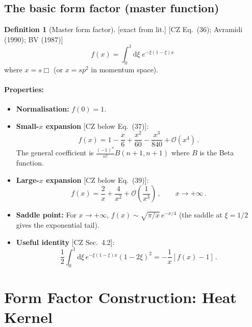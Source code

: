 \documentclass[12pt,a4paper]{article}
\theoremstyle{definition}
\newtheorem{definition}[proposition]{Definition}
\theoremstyle{remark}
\newcommand{\dd}{\mathrm{d}}
\newcommand{\fromlit}[1]{\textcolor{blue!70!black}{\textsf{[#1]}}}
\newcommand{\exactlit}{\textcolor{blue!60!black}{\textsf{[exact from lit.]}}}
\begin{document}
\subsection{The basic form factor (master function)}

\begin{definition}[Master form factor]
\exactlit\;
\fromlit{CZ Eq.~(36); Avramidi (1990); BV (1987)}
\begin{equation}
  \boxed{
  f(x) = \int_0^1 \dd\xi\; e^{-\xi(1-\xi)x}
  }
  \label{eq:master-f}
\end{equation}
where $x = s\Box$ (or $x = sp^2$ in momentum space).
\end{definition}

\paragraph{Properties:}
\begin{itemize}
\item \textbf{Normalisation:} $f(0) = 1$.
\item \textbf{Small-$x$ expansion} \fromlit{CZ below Eq.~(37)}:
  \begin{equation}
    f(x) = 1 - \frac{x}{6} + \frac{x^2}{60} - \frac{x^3}{840}
    + \mathcal{O}(x^4)\,.
    \label{eq:f-small}
  \end{equation}
  The general coefficient is
  $\frac{(-1)^n}{n!}B(n+1,n+1)$ where $B$ is the Beta function.
\item \textbf{Large-$x$ expansion} \fromlit{CZ below Eq.~(39)}:
  \begin{equation}
    f(x) = \frac{2}{x} + \frac{4}{x^2}
    + \mathcal{O}\!\left(\frac{1}{x^3}\right)\,,
    \qquad x\to+\infty\,.
    \label{eq:f-large}
  \end{equation}
\item \textbf{Saddle point:} For $x\to+\infty$,
  $f(x) \sim \sqrt{\pi/x}\,e^{-x/4}$
  (the saddle at $\xi=1/2$ gives the exponential tail).
\item \textbf{Useful identity} \fromlit{CZ Sec.~4.2}:
  \begin{equation}
    \frac{1}{2}\int_0^1\dd\xi\, e^{-\xi(1-\xi)x}(1-2\xi)^2
    = -\frac{1}{x}[f(x)-1]\,.
    \label{eq:f-identity}
  \end{equation}
\end{itemize}


\newpage
\section{Form Factor Construction: Heat Kernel}
\label{sec:form-factors-hk}
\end{document}
